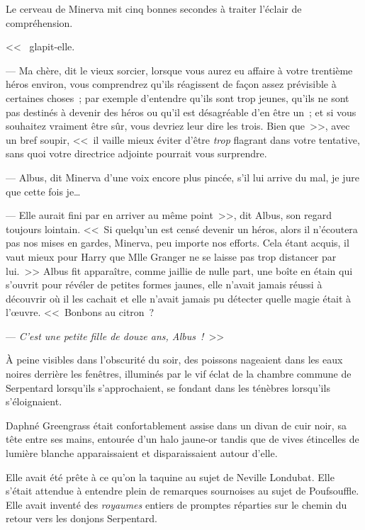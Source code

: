 Le cerveau de Minerva mit cinq bonnes secondes à traiter l'éclair de compréhension.

<<~ glapit-elle.

--- Ma chère, dit le vieux sorcier, lorsque vous aurez eu affaire à votre trentième héros environ, vous comprendrez qu'ils réagissent de façon assez prévisible à certaines choses~; par exemple d'entendre qu'ils sont trop jeunes, qu'ils ne sont pas destinés à devenir des héros ou qu'il est désagréable d'en être un~; et si vous souhaitez vraiment être sûr, vous devriez leur dire les trois. Bien que~>>, avec un bref soupir, <<~il vaille mieux éviter d'être \emph{trop} flagrant dans votre tentative, sans quoi votre directrice adjointe pourrait vous surprendre.

--- Albus, dit Minerva d'une voix encore plus pincée, s'il lui arrive du mal, je jure que cette fois je…

--- Elle aurait fini par en arriver au même point~>>, dit Albus, son regard toujours lointain. <<~Si quelqu'un est censé devenir un héros, alors il n'écoutera pas nos mises en gardes, Minerva, peu importe nos efforts. Cela étant acquis, il vaut mieux pour Harry que Mlle Granger ne se laisse pas trop distancer par lui.~>> Albus fit apparaître, comme jaillie de nulle part, une boîte en étain qui s'ouvrit pour révéler de petites formes jaunes, elle n'avait jamais réussi à découvrir où il les cachait et elle n'avait jamais pu détecter quelle magie était à l'œuvre. <<~Bonbons au citron~?

--- \emph{C'est une petite fille de douze ans, Albus~!}~>>


À peine visibles dans l'obscurité du soir, des poissons nageaient dans les eaux noires derrière les fenêtres, illuminés par le vif éclat de la chambre commune de Serpentard lorsqu'ils s'approchaient, se fondant dans les ténèbres lorsqu'ils s'éloignaient.

Daphné Greengrass était confortablement assise dans un divan de cuir noir, sa tête entre ses mains, entourée d'un halo jaune-or tandis que de vives étincelles de lumière blanche apparaissaient et disparaissaient autour d'elle.

Elle avait été prête à ce qu'on la taquine au sujet de Neville Londubat. Elle s'était attendue à entendre plein de remarques sournoises au sujet de Poufsouffle. Elle avait inventé des \emph{royaumes} entiers de promptes réparties sur le chemin du retour vers les donjons Serpentard.

